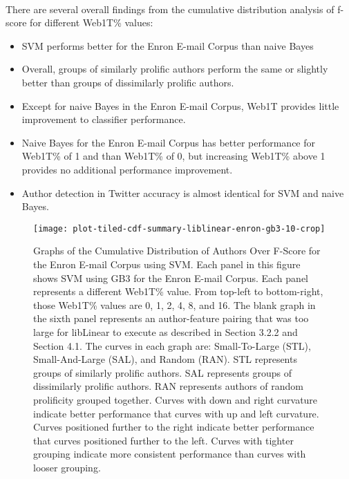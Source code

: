 	\paragraph*{} There are several overall findings from the cumulative distribution analysis of f-score for different Web1T\% values:
	\begin{itemize}
	\item SVM performs better for the Enron E-mail Corpus than naive Bayes
	\item Overall, groups of similarly prolific authors perform the same or slightly better than groups of dissimilarly prolific authors.
	\item Except for naive Bayes in the Enron E-mail Corpus, Web1T provides little improvement to classifier performance.
	\item Naive Bayes for the Enron E-mail Corpus has better performance for Web1T\% of 1 and than Web1T\% of 0, but increasing Web1T\% above 1 provides no additional performance improvement.
	\item Author detection in Twitter accuracy is almost identical for SVM and naive Bayes.
	\end{itemize}
	
	\begin{figure}[htbp!]
		\begin{center}
		\centering
		\texttt{[image: plot-tiled-cdf-summary-liblinear-enron-gb3-10-crop]}
		\caption{Graphs of the Cumulative Distribution of Authors Over F-Score for the Enron E-mail Corpus using SVM. Each panel in this figure shows SVM using GB3 for the Enron E-mail Corpus.  Each panel represents a different Web1T\% value.  From top-left to bottom-right, those Web1T\% values are 0, 1, 2, 4, 8, and 16.  The blank graph in the sixth panel represents an author-feature pairing that was too large for libLinear to execute as described in Section 3.2.2 and Section 4.1.  The curves in each graph are: Small-To-Large (STL), Small-And-Large (SAL), and Random (RAN).  STL represents groups of similarly prolific authors.  SAL represents groups of dissimilarly prolific authors.  RAN represents authors of random prolificity grouped together.  Curves with down and right curvature indicate better performance that curves with up and left curvature.  Curves positioned further to the right indicate better performance that curves positioned further to the left.  Curves with tighter grouping indicate more consistent performance than curves with looser grouping.}
		\label{fig:plot-tiled-cdf-summary-liblinear-enron-gb3-10}
		\end{center}
	\end{figure}
	
